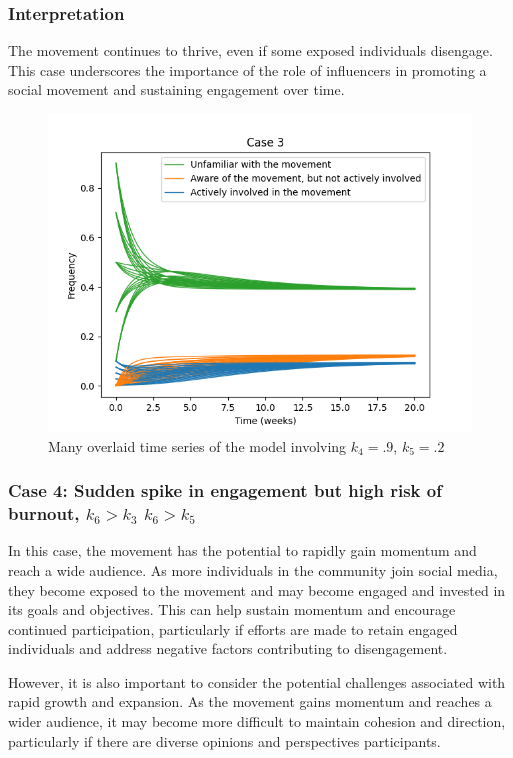 \documentclass{article}
\begin{document}
    \subsubsection*{Interpretation} The movement continues to thrive, even if some exposed individuals disengage. This case underscores the importance of the role of influencers in promoting a social movement and sustaining engagement over time. 

    \begin{figure}[H]

        \centering
        \includegraphics[width=\textwidth]{simulation/plots/case3.png}   
        \caption{Many overlaid time series of the model involving \mbox{$k_4=.9$}, \mbox{$k_5=.2$}}
        \label{fig:case3}
    \end{figure}


    \subsubsection*{Case 4: Sudden spike in engagement but high risk of burnout, $k_6 > k_3$  $k_6 > k_5$}
   In this case, the movement has the potential to rapidly gain momentum and reach a wide audience. As more individuals in the community join social media, they become exposed to the movement and may become engaged and invested in its goals and objectives. This can help sustain momentum and encourage continued participation, particularly if efforts are made to retain engaged individuals and address negative factors contributing to disengagement. 
   
   However, it is also important to consider the potential challenges associated with rapid growth and expansion. As the movement gains momentum and reaches a wider audience, it may become more difficult to maintain cohesion and direction, particularly if there are diverse opinions and perspectives  participants.
   
\end{document}
